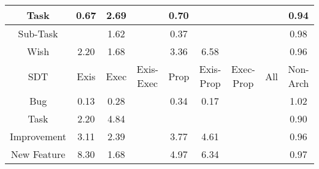 \begin{tabular}{|c||c|c|c|c|c|c|c|c|}
\hline
Task & \cellcolor[rgb]{0.8597456561201304,0.6021294389686168,0.3730959457121216} 0.67 & \cellcolor[rgb]{0.8754351109849825,0.8236271578349916,0.42} 2.69 &  & \cellcolor[rgb]{0.863852527187281,0.6215686286864635,0.3769290253747956} 0.70 &  &  &  & \cellcolor[rgb]{0.9003226589056345,0.7941939188200028,0.4109678149785921} 0.94 \\ 
\hline
Sub-Task &  & \cellcolor[rgb]{0.8973471991088483,0.8340065679989281,0.42} 1.62 &  & \cellcolor[rgb]{0.8122769853450901,0.37744439730009294,0.32879185298875074} 0.37 &  &  &  & \cellcolor[rgb]{0.9065582433230217,0.823709018395636,0.4167876937681536} 0.98 \\ 
\hline
Wish & \cellcolor[rgb]{0.885447329065585,0.8283697874521192,0.42} 2.20 & \cellcolor[rgb]{0.896125361508628,0.8334278028198763,0.42} 1.68 &  & \cellcolor[rgb]{0.8617094996687032,0.8171255524746488,0.42} 3.36 & \cellcolor[rgb]{0.7957520590095615,0.785882554267687,0.42000000000000004} 6.58 &  &  & \cellcolor[rgb]{0.9033611942676607,0.8085763195335935,0.41380378131648327} 0.96 \\ 
\hline
\hline
SDT & Exis & Exec & Exis-Exec & Prop & Exis-Prop & Exec-Prop & All & Non-Arch \\ 
\hline
Bug & \cellcolor[rgb]{0.7755208557530117,0.20346538389758828,0.2944861320361442} 0.13 & \cellcolor[rgb]{0.7993850930366774,0.31642277370693944,0.31675942016756553} 0.28 &  & \cellcolor[rgb]{0.8079711568712665,0.3570634758573282,0.3247730797465155} 0.34 & \cellcolor[rgb]{0.7815554386043408,0.23202907606054657,0.30011840936405143} 0.17 &  &  & \cellcolor[rgb]{0.9095989124051869,0.8398100111392991,0.42} 1.02 \\ 
\hline
Task & \cellcolor[rgb]{0.8855221936323932,0.8284052496153441,0.42} 2.20 & \cellcolor[rgb]{0.8313854564785246,0.8027615320161432,0.41999999999999993} 4.84 &  &  &  &  &  & \cellcolor[rgb]{0.8953171542053935,0.7705011965721958,0.40629601059170056} 0.90 \\ 
\hline
Improvement & \cellcolor[rgb]{0.8668224455949501,0.8195474742291868,0.42} 3.11 & \cellcolor[rgb]{0.8815068059200749,0.8265032238568776,0.42} 2.39 &  & \cellcolor[rgb]{0.8533760394437266,0.8131781239470284,0.41999999999999993} 3.77 & \cellcolor[rgb]{0.8361424581584787,0.8050148486013846,0.42000000000000004} 4.61 &  &  & \cellcolor[rgb]{0.90375445218686,0.8104377403511372,0.4141708220410693} 0.96 \\ 
\hline
New Feature & \cellcolor[rgb]{0.760516563783485,0.7691920565290192,0.42} 8.30 & \cellcolor[rgb]{0.8961311900525621,0.8334305637091084,0.42} 1.68 &  & \cellcolor[rgb]{0.8286200738229318,0.8014516139161256,0.42000000000000004} 4.97 & \cellcolor[rgb]{0.8006602713620685,0.7882074969609798,0.41999999999999993} 6.34 &  &  & \cellcolor[rgb]{0.9048066526964307,0.8154181560964386,0.415152875850002} 0.97 \\ 

\end{tabular}
